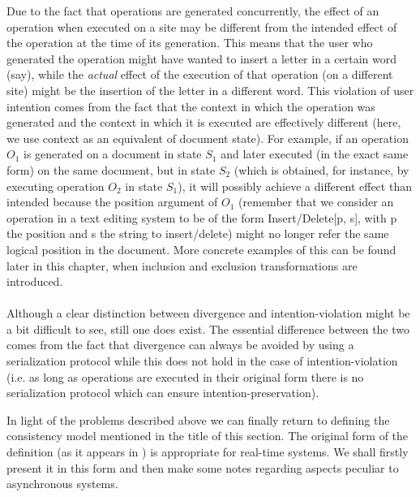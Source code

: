 Due to the fact that operations are generated concurrently, the effect of an operation
when executed on a site may be different from the intended effect of the operation
at the time of its generation. This means that the user who generated the operation
might have wanted to insert a letter in a certain word (say), while the \emph{actual}
effect of the execution of that operation (on a different site) might be the insertion
of the letter in a different word. This violation of user intention comes from the
fact that the context in which the operation was generated and the context in which
it is executed are effectively different (here, we use context as an equivalent of
document state). For example, if an operation $O_{1}$ is generated on a document in state $S_{1}$
and later executed (in the exact same form) on the same document, but in state $S_{2}$ (which
is obtained, for instance, by executing operation $O_{2}$ in state $S_{1}$), it will possibly
achieve a different effect than intended because the position argument of
$O_{1}$ (remember that we consider an operation in a text editing system to be of the
form Insert/Delete[p, s], with p the position and s the string to insert/delete) might
no longer refer the same logical position in the document. More concrete
examples of this can be found later in this chapter, when inclusion and exclusion
transformations are introduced.
\\
\\
Although a clear distinction between divergence and intention-violation might be
a bit difficult to see, still one does exist. The essential difference between the
two comes from the fact that divergence can always be avoided by using a serialization
protocol while this does not hold in the case of intention-violation (i.e. as long
as operations are executed in their original form there is no serialization protocol
which can ensure intention-preservation). 

In light of the problems described above we can finally return to defining the consistency
model mentioned in the title of this section. The original form of the definition
(as it appears in \cite{sun96}) is appropriate for real-time systems. We shall firstly
present it in this form and then make some notes regarding aspects peculiar to asynchronous
systems.

